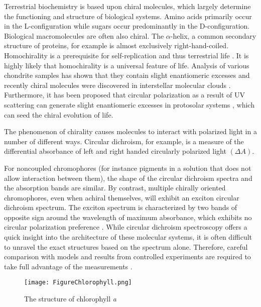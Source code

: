 \documentclass[review]{elsarticle}
\begin{document}
Terrestrial biochemistry is based upon chiral molecules, which largely determine the functioning and structure of biological systems. Amino acids primarily occur in the L-configuration while sugars occur predominantly in the D-configuration. Biological macromolecules are often also chiral. The $\alpha$-helix, a common secondary structure of proteins, for example is almost exclusively right-hand-coiled. Homochirality is a prerequisite for self-replication and thus terrestrial life \cite{Popa2004, Bonner1995, Jafarpour2015}. It is highly likely that homochirality is a universal feature of life. Analysis of various chondrite samples has shown that they contain slight enantiomeric excesses \cite{Cronin1997, Pizzarello2000} and recently chiral molecules were discovered in interstellar molecular clouds \cite{McGuire2016}. Furthermore, it has been proposed that circular polarization as a result of UV scattering can generate slight enantiomeric excesses in protosolar systems \cite{Bailey1998}, which can seed the chiral evolution of life. 

The phenomenon of chirality causes molecules to interact with polarized light in a number of different ways. Circular dichroism, for example, is a measure of the differential absorbance of left and right handed circularly polarized light $(\Delta A)$. 

For noncoupled chromophores (for instance pigments in a solution that does not allow interaction between them), the shape of the circular dichroism spectra and the absorption bands are similar. By contrast, multiple chirally oriented chromophores, even when achiral themselves, will exhibit an exciton circular dichroism spectrum. The exciton spectrum is characterized by two bands of opposite sign around the wavelength of maximum absorbance, which exhibits no circular polarization preference \cite{Hembury2008,Gottarelli2008,Berova2000}. While circular dichroism spectroscopy offers a quick insight into the architecture of these molecular systems, it is often difficult to unravel the exact structures based on the spectrum alone. Therefore, careful comparison with models and results from controlled experiments are required to take full advantage of the measurements \cite{Hembury2008,Berova2000}. 

\begin{figure*}[ht]
  \centering
  \texttt{[image: FigureChlorophyll.png]}
  \caption{The structure of chlorophyll \textit{a}}
  \label{fig:Chlorophyll}
\end{figure*}
\end{document}
